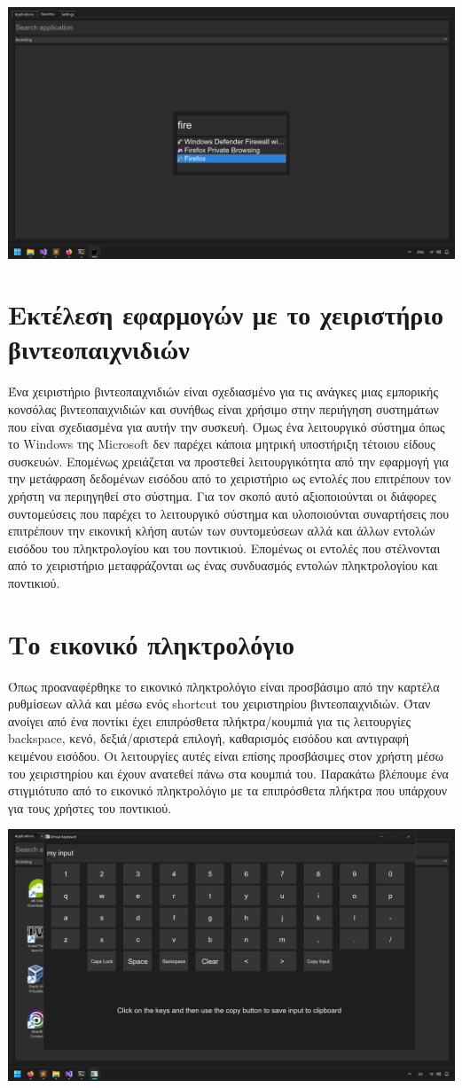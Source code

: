 \includegraphics[width=1.0\textwidth]{./images/window_keyboard_search.png}


\section{Εκτέλεση εφαρμογών με το χειριστήριο βιντεοπαιχνιδιών}

Ένα χειριστήριο βιντεοπαιχνιδιών είναι σχεδιασμένο για τις ανάγκες μιας εμπορικής κονσόλας
βιντεοπαιχνιδιών και συνήθως είναι χρήσιμο στην περιήγηση συστημάτων που είναι σχεδιασμένα
για αυτήν την συσκευή. Όμως ένα λειτουργικό σύστημα όπως το Windows της Microsoft δεν
παρέχει κάποια μητρική υποστήριξη τέτοιου είδους συσκευών. Επομένως χρειάζεται να προστεθεί
λειτουργικότητα από την εφαρμογή για την μετάφραση δεδομένων εισόδου από το χειριστήριο ως
εντολές που επιτρέπουν τον χρήστη να περιηγηθεί στο σύστημα. Για τον σκοπό αυτό αξιοποιούνται
οι διάφορες συντομεύσεις που παρέχει το λειτουργικό σύστημα και υλοποιούνται συναρτήσεις που
επιτρέπουν την εικονική κλήση αυτών των συντομεύσεων αλλά και άλλων εντολών εισόδου του
πληκτρολογίου και του ποντικιού. Επομένως οι εντολές που στέλνονται από το χειριστήριο μεταφράζονται
ως ένας συνδυασμός εντολών πληκτρολογίου και ποντικιού. 


\section{Το εικονικό πληκτρολόγιο}
Όπως προαναφέρθηκε το εικονικό πληκτρολόγιο είναι προσβάσιμο από την καρτέλα ρυθμίσεων αλλά και
μέσω ενός shortcut του χειριστηρίου βιντεοπαιχνιδιών. Όταν ανοίγει από ένα ποντίκι έχει επιπρόσθετα
πλήκτρα/κουμπιά για τις λειτουργίες backspace, κενό, δεξιά/αριστερά επιλογή, καθαρισμός εισόδου και
αντιγραφή κειμένου εισόδου. Οι λειτουργίες αυτές είναι επίσης προσβάσιμες στον χρήστη μέσω του
χειριστηρίου και έχουν ανατεθεί πάνω στα κουμπιά του. Παρακάτω βλέπουμε ένα στιγμιότυπο από το
εικονικό πληκτρολόγιο με τα επιπρόσθετα πλήκτρα που υπάρχουν για τους χρήστες του ποντικιού.


\includegraphics[width=1.0\textwidth]{./images/virtual_keyboard.png}